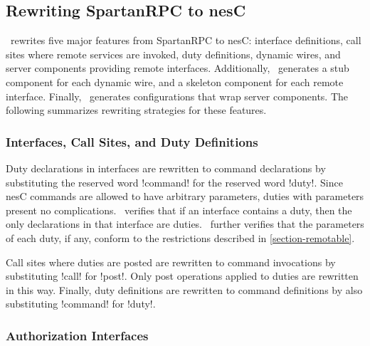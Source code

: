 \subsection{Rewriting SpartanRPC to nesC}

\Sprocket\ rewrites five major features from SpartanRPC to nesC: interface definitions, call
sites where remote services are invoked, duty definitions, dynamic wires, and server components
providing remote interfaces. Additionally, \Sprocket\ generates a stub component for each
dynamic wire, and a skeleton component for each remote interface. Finally, \Sprocket\ generates
configurations that wrap server components. The following summarizes rewriting strategies for
these features.


\subsubsection{Interfaces, Call Sites, and Duty Definitions}

Duty declarations in interfaces are rewritten to command declarations by substituting the
reserved word !command! for the reserved word !duty!. Since nesC commands are allowed to have
arbitrary parameters, duties with parameters present no complications. \Sprocket\ verifies that
if an interface contains a duty, then the only declarations in that interface are duties.
\Sprocket\ further verifies that the parameters of each duty, if any, conform to the
restrictions described in \autoref{section-remotable}.


Call sites where duties are posted are rewritten to command invocations by substituting !call!
for !post!. Only post operations applied to duties are rewritten in this way. Finally, duty
definitions are rewritten to command definitions by also substituting !command! for !duty!.

\subsubsection{Authorization Interfaces}

